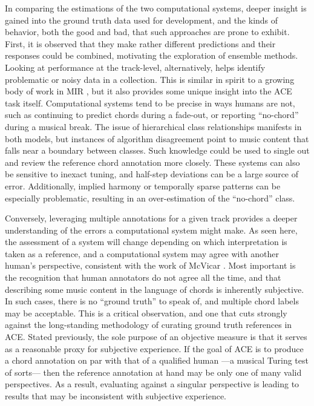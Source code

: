 In comparing the estimations of the two computational systems, deeper insight is gained into the ground truth data used for development, and the kinds of behavior, both the good and bad, that such approaches are prone to exhibit.
First, it is observed that they make rather different predictions and their responses could be combined, motivating the exploration of ensemble methods.
Looking at performance at the track-level, alternatively, helps identify problematic or noisy data in a collection.
This is similar in spirit to a growing body of work in MIR \cite{Zapata2012Assigning}, but it also provides some unique insight into the ACE task itself.
Computational systems tend to be precise in ways humans are not, such as continuing to predict chords during a fade-out, or reporting ``no-chord'' during a musical break.
The issue of hierarchical class relationships manifests in both models, but instances of algorithm disagreement point to music content that falls near a boundary between classes.
Such knowledge could be used to single out and review the reference chord annotation more closely.
These systems can also be sensitive to inexact tuning, and half-step deviations can be a large source of error.
Additionally, implied harmony or temporally sparse patterns can be especially problematic, resulting in an over-estimation of the ``no-chord'' class.


Conversely, leveraging multiple annotations for a given track provides a deeper understanding of the errors a computational system might make.
As seen here, the assessment of a system will change depending on which interpretation is taken as a reference, and a computational system may agree with another human's perspective, consistent with the work of McVicar \cite{Ni2013Understanding}.
Most important is the recognition that human annotators do not agree all the time, and that describing some music content in the language of chords is inherently subjective.
In such cases, there is no ``ground truth'' to speak of, and multiple chord labels may be acceptable.
This is a critical observation, and one that cuts strongly against the long-standing methodology of curating ground truth references in ACE.
Stated previously, the sole purpose of an objective measure is that it serves as a reasonable proxy for subjective experience.
If the goal of ACE is to produce a chord annotation on par with that of a qualified human ---a musical Turing test of sorts--- then the reference annotation at hand may be only one of many valid perspectives.
As a result, evaluating against a singular perspective is leading to results that may be inconsistent with subjective experience.


